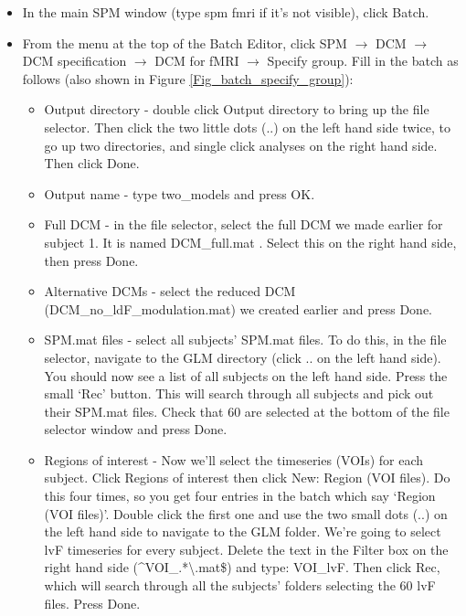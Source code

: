 \documentclass{article}
\begin{document}
\begin{itemize}

\item In the main SPM window (type spm fmri if it's not visible), click Batch.

\item From the menu at the top of the Batch Editor, click SPM $\rightarrow$ DCM $\rightarrow$ DCM specification $\rightarrow$ DCM for fMRI $\rightarrow$ Specify group. Fill in the batch as follows (also shown in Figure \ref{Fig_batch_specify_group}):

\begin{itemize}
    

\item Output directory - double click Output directory to bring up the file selector. Then click the two little dots (..) on the left hand side twice, to go up two directories, and single click analyses on the right hand side. Then click Done.

\item Output name - type two\_models and press OK.

\item Full DCM - in the file selector, select the full DCM we made earlier for subject 1. It is named DCM\_full.mat . Select this on the right hand side, then press Done.

\item Alternative DCMs - select the reduced DCM (DCM\_no\_ldF\_modulation.mat) we created earlier and press Done.

\item SPM.mat files - select all subjects' SPM.mat files. To do this, in the file selector, navigate to the GLM directory (click .. on the left hand side). You should now see a list of all subjects on the left hand side. Press the small `Rec' button. This will search through all subjects and pick out their SPM.mat files. Check that 60 are selected at the bottom of the file selector window and press Done.

\item Regions of interest - Now we'll select the timeseries (VOIs) for each subject. Click Regions of interest then click New: Region (VOI files). Do this four times, so you get four entries in the batch which say `Region (VOI files)'. Double click the first one and use the two small dots (..) on the left hand side to navigate to the GLM folder. We're going to select lvF timeseries for every subject. Delete the text in the Filter box on the right hand side (\textasciicircum VOI\_.*\textbackslash.mat\$) and type: VOI\_lvF. Then click Rec, which will search through all the subjects' folders selecting the 60 lvF files. Press Done.


\end{itemize}
\end{itemize}
\end{document}

